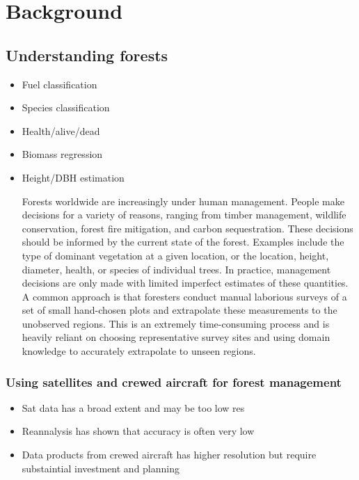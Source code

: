 
\chapter{Background} \label{chapBackground}

\section{Understanding forests}
\begin{itemize}
    \item Fuel classification
    \item Species classification
    \item Health/alive/dead
    \item Biomass regression
    \item Height/DBH estimation
    
Forests worldwide are increasingly under human management. People make decisions for a variety of reasons, ranging from timber management, wildlife conservation, forest fire mitigation, and carbon sequestration. These decisions should be informed by the current state of the forest. Examples include the type of dominant vegetation at a given location, or the location, height, diameter, health, or species of individual trees.
In practice, management decisions are only made with limited imperfect estimates of these quantities. A common approach is that foresters conduct manual laborious surveys of a set of small hand-chosen plots and extrapolate these measurements to the unobserved regions. This is an extremely time-consuming process and is heavily reliant on choosing representative survey sites and using domain knowledge to accurately extrapolate to unseen regions.

\end{itemize}

\subsection{Using satellites and crewed aircraft for forest management}
\begin{itemize}
    \item Sat data has a broad extent and may be too low res
    \item Reannalysis has shown that accuracy is often very low 
    \item Data products from crewed aircraft has higher resolution but require substaintial investment and planning
\end{itemize}

